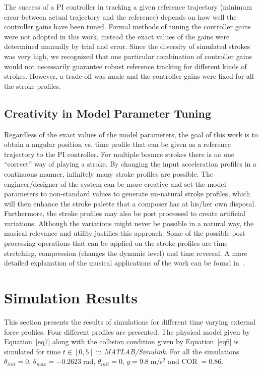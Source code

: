 \documentclass[final,1p,times]{elsarticle}
\begin{document}
The success of a PI controller in tracking a given reference trajectory (minimum error
between actual trajectory and the reference) depends on how well the controller gains have been tuned. Formal methods of tuning the controller gains were not adopted in this work, instead
the exact values of the gains were determined manually by trial and error. Since the diversity of simulated strokes was very high, we recognized that one particular combination of controller gains would not necessarily guarantee robust reference tracking for different kinds of strokes. However, a trade-off was made and the controller gains were fixed for all the stroke profiles. 

\subsection{Creativity in Model Parameter Tuning}
Regardless of the exact values of the model parameters, the goal
of this work is to obtain a angular position vs. time profile that can be given as a reference trajectory to the PI controller. For multiple bounce strokes there is no one ``correct'' way of playing a stroke. By changing the input acceleration profiles in a continuous manner, infinitely many stroke profiles are possible. The engineer/designer of the system can be more creative and set the model parameters to non-standard values to generate un-natural stroke profiles, which will then enhance the stroke palette that a composer has at his/her own disposal. Furthermore, the stroke profiles may also be post processed to create artificial variations. Although the variations might never be possible in a natural way, the musical relevance and utility justifies this approach. Some of the possible post processing operations that can be applied on the stroke profiles are time stretching, compression (changes the dynamic level) and time reversal. A more detailed explanation of the musical applications of the work can be found in~\cite{edakkattil2015enhancing}.

\section{Simulation Results}
This section presents the results of simulations for different time varying
external force profiles. Four different profiles are presented.
The physical model given by Equation~\ref{eq7} along with the collision condition given by Equation~\ref{eq6} is simulated for time $t \in [0,5]$ in \textit{MATLAB/Simulink}.
 For all the simulations $\theta_{init} = 0$, $\theta_{max} = -0.2623\;$rad, $\dot{\theta}_{init} = 0$,  $g = 9.8\;$m/s$^2$ and COR$\;=0.86$.
\end{document}

